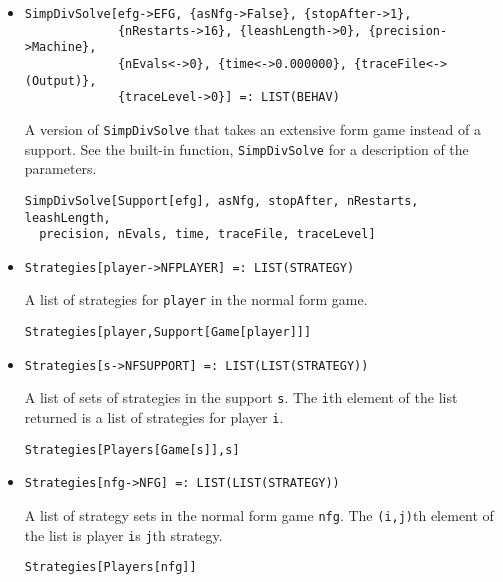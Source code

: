 \begin{itemize}
\item{}
\protect \large \begin{verbatim}
SimpDivSolve[efg->EFG, {asNfg->False}, {stopAfter->1}, 
             {nRestarts->16}, {leashLength->0}, {precision->Machine}, 
             {nEvals<->0}, {time<->0.000000}, {traceFile<->(Output)}, 
             {traceLevel->0}] =: LIST(BEHAV) 
\end{verbatim}\normalsize

\bd 
A version of \verb+SimpDivSolve+ that takes an extensive form
game instead of a support.  See the built-in function,
\verb+SimpDivSolve+ for a description of the parameters.
\begin{verbatim}
SimpDivSolve[Support[efg], asNfg, stopAfter, nRestarts, leashLength,
  precision, nEvals, time, traceFile, traceLevel]
\end{verbatim} 
\ed

\item{}
\protect \large \begin{verbatim}
Strategies[player->NFPLAYER] =: LIST(STRATEGY) 
\end{verbatim}\normalsize

\bd 
A list of strategies for \verb+player+ in the normal form game.  
\begin{verbatim}
Strategies[player,Support[Game[player]]]
\end{verbatim} 
\ed

\item{}
\protect \large \begin{verbatim}
Strategies[s->NFSUPPORT] =: LIST(LIST(STRATEGY)) 
\end{verbatim}\normalsize

\bd 
A list of sets of strategies in the support \verb+s+. The \verb+i+th
element of the list returned is a list of strategies for player
\verb+i+.   
\begin{verbatim}
Strategies[Players[Game[s]],s]
\end{verbatim} 
\ed


\item{}
\protect \large \begin{verbatim}
Strategies[nfg->NFG] =: LIST(LIST(STRATEGY)) 
\end{verbatim}\normalsize

\bd 
A list of strategy sets in the normal form game \verb+nfg+. The
\verb+(i,j)+th element of the list is player \verb+i+s \verb+j+th
strategy.  
\begin{verbatim}
Strategies[Players[nfg]]
\end{verbatim} 
\ed


\end{itemize}
